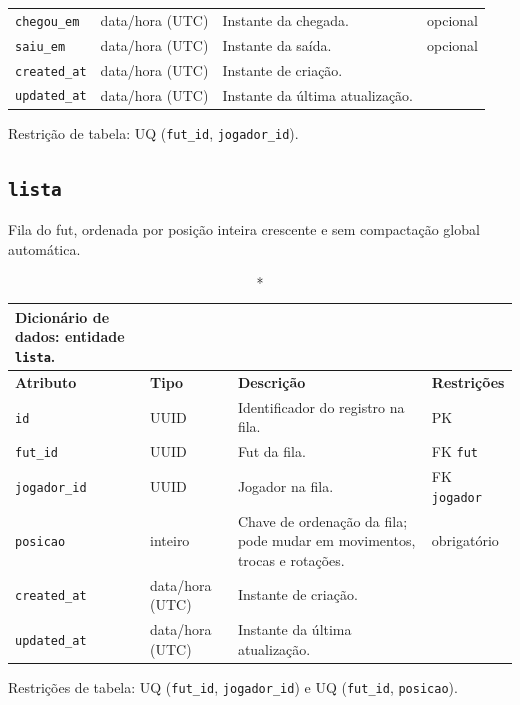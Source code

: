 \begin{apendicesenv}
\begin{longtable}{p{2.5cm}p{2.1cm}p{5.8cm}p{2.9cm}}
        \texttt{chegou\_em} & data/hora (UTC) & Instante da chegada. & opcional \\
        \texttt{saiu\_em} & data/hora (UTC) & Instante da saída. & opcional \\
        \texttt{created\_at} & data/hora (UTC) & Instante de criação. & \\
        \texttt{updated\_at} & data/hora (UTC) & Instante da última atualização. & \\
        \hline
    \end{longtable}
    \noindent Restrição de tabela: UQ (\texttt{fut\_id}, \texttt{jogador\_id}).

    \subsection*{\texttt{lista}}
    Fila do fut, ordenada por posição inteira crescente e sem compactação global automática.
    \begin{longtable}{p{2.5cm}p{2.1cm}p{5.8cm}p{2.9cm}}
    \caption*{Dicionário de dados: entidade \texttt{lista}.}\\
        \hline
        \textbf{Atributo} & \textbf{Tipo} & \textbf{Descrição} & \textbf{Restrições} \\
        \hline
        \endhead
        \texttt{id} & UUID & Identificador do registro na fila. & PK \\
        \texttt{fut\_id} & UUID & Fut da fila. & FK \texttt{fut} \\
        \texttt{jogador\_id} & UUID & Jogador na fila. & FK \texttt{jogador} \\
        \texttt{posicao} & inteiro & Chave de ordenação da fila; pode mudar em movimentos, trocas e rotações. & obrigatório \\
        \texttt{created\_at} & data/hora (UTC) & Instante de criação. & \\
        \texttt{updated\_at} & data/hora (UTC) & Instante da última atualização. & \\
        \hline
    \end{longtable}
    \noindent Restrições de tabela: UQ (\texttt{fut\_id}, \texttt{jogador\_id}) e UQ (\texttt{fut\_id}, \texttt{posicao}).


\end{apendicesenv}
